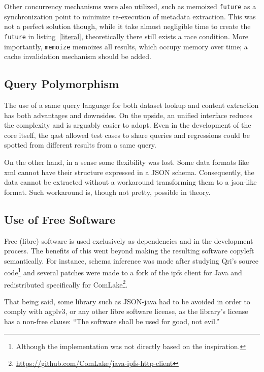 Other concurrency mechanisms were also utilized, such as memoized \verb|future|
as a synchronization point to minimize re-execution of metadata extraction.
This was not a perfect solution though, while it take almost negligible time
to create the \verb|future| in listing~\ref{literal}, theoretically there still
exists a race condition.  More importantly, \verb|memoize| memoizes all results,
which occupy memory over time; a cache invalidation mechanism should be added.

\subsection{Query Polymorphism}
The use of a same query language for both dataset lookup and content extraction
has both advantages and downsides.  On the upside, an unified interface
reduces the complexity and is arguably easier to adopt.  Even in the development
of the core itself, the \gls{qast} allowed test cases to share queries
and regressions could be spotted from different results from a same query.

On the other hand, in a sense some flexibility was lost.  Some data formats
like \gls{xml} cannot have their structure expressed in a JSON schema.
Consequently, the data cannot be extracted without a workaround transforming
them to a \gls{json}-like format.  Such workaround is, though not pretty,
possible in theory.

\subsection{Use of Free Software}
Free (libre) software is used exclusively as dependencies and in the development
process.  The benefits of this went beyond making the resulting software
copyleft semantically.  For instance, schema inference was made after
studying Qri's source code\footnote{Although the implementation was not
directly based on the inspiration.} and several patches were made to a fork
of the \gls{ipfs} client for Java and redistributed specifically for
ComLake\footnote{\url{https://github.com/ComLake/java-ipfs-http-client}}.

That being said, some library such as JSON-java had to be avoided in order
to comply with \gls{agplv3}, or any other libre software license, as the
library's license has a non-free clause: ``The software shall be used for good,
not evil.''
